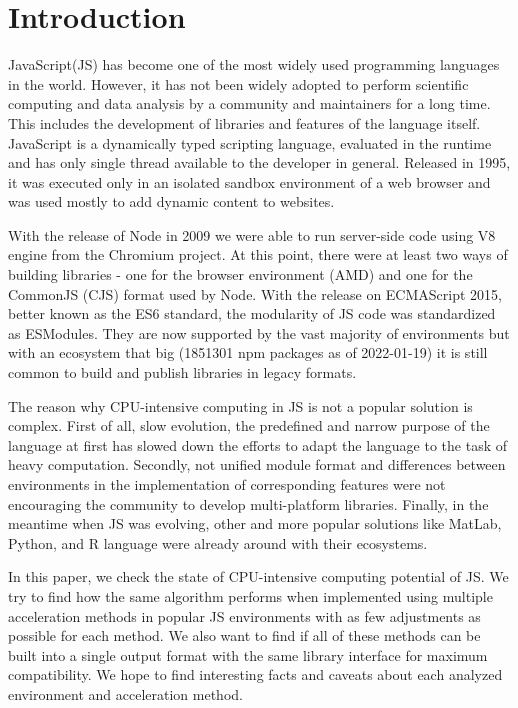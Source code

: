 \section{Introduction}\label{sec:introduction}
JavaScript(JS) has become one of the most widely used programming languages in the world. However, it has not been widely adopted to perform scientific computing and data analysis by a community and maintainers for a long time. This includes the development of libraries and features of the language itself. JavaScript is a dynamically typed scripting language, evaluated in the runtime and has only single thread available to the developer in general. Released in 1995, it was executed only in an isolated sandbox environment of a web browser and was used mostly to add dynamic content to websites.

With the release of Node in 2009 we were able to run server-side code using V8 engine from the Chromium project. At this point, there were at least two ways of building libraries - one for the browser environment (AMD) and one for the CommonJS (CJS) format used by Node. With the release on ECMAScript 2015, better known as the ES6 standard, the modularity of JS code was standardized as ESModules. They are now supported by the vast majority of environments but with an ecosystem that big (1851301 npm packages as of 2022-01-19) it is still common to build and publish libraries in legacy formats. 

The reason why CPU-intensive computing in JS is not a popular solution is complex. First of all, slow evolution, the predefined and narrow purpose of the language at first has slowed down the efforts to adapt the language to the task of heavy computation. Secondly, not unified module format and differences between environments in the implementation of corresponding features were not encouraging the community to develop multi-platform libraries. Finally, in the meantime when JS was evolving, other and more popular solutions like MatLab, Python, and R language were already around with their ecosystems.

In this paper, we check the state of CPU-intensive computing potential of JS. We try to find how the same algorithm performs when implemented using multiple acceleration methods in popular JS environments with as few adjustments as possible for each method. We also want to find if all of these methods can be built into a single output format with the same library interface for maximum compatibility. We hope to find interesting facts and caveats about each analyzed environment and acceleration method.

